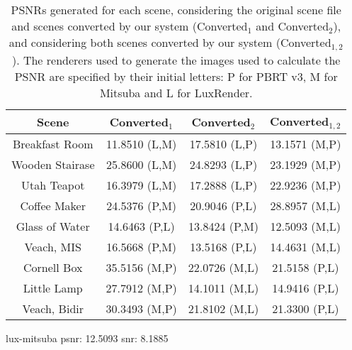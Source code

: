 \scriptsize
\begin{table}
\begin{center}
    \setlength\extrarowheight{4pt}
    \begin{tabular}{ | c | c | c | c | }
    \hline
    {\bf Scene} & {\bf Converted$_1$} & {\bf Converted$_2$} & {\bf Converted$_{1,2}$} \\ 
    \hline
    Breakfast Room & 11.8510 \small{(L,M)} & 17.5810 \small{(L,P)} & 13.1571 \small{(M,P)} \\
    Wooden Stairase & 25.8600 \small{(L,M)} & 24.8293 \small{(L,P)} & 23.1929 \small{(M,P)} \\
    Utah Teapot & 16.3979 \small{(L,M)} & 17.2888 \small{(L,P)} & 22.9236 \small{(M,P)} \\
    Coffee Maker & 24.5376 \small{(P,M)} & 20.9046 \small{(P,L)} & 28.8957 \small{(M,L)} \\
    Glass of Water & 14.6463 \small{(P,L)} & 13.8424 \small{(P,M)} & 12.5093 \small{(M,L)} \\
    Veach, MIS & 16.5668 \small{(P,M)} & 13.5168 \small{(P,L)} & 14.4631 \small{(M,L)} \\
    Cornell Box & 35.5156 \small{(M,P)} & 22.0726 \small{(M,L)} & 21.5158 \small{(P,L)} \\
    Little Lamp & 27.7912 \small{(M,P)} & 14.1011 \small{(M,L)} & 14.9416 \small{(P,L)} \\
    Veach, Bidir & 30.3493 \small{(M,P)} & 21.8102 \small{(M,L)} & 21.3300 \small{(P,L)} \\
    
    \hline

    \end{tabular}
\end{center}
  \caption{PSNRs generated for each scene, considering the original scene file and scenes converted by our system (Converted$_1$ and Converted$_2$), and considering both scenes converted by our system (Converted$_{1,2}$). The renderers used to generate the images used to calculate the PSNR are specified by their initial letters: P for PBRT v3, M for Mitsuba and L for LuxRender. } 
  \label{table:psnr}
\end{table}
\normalsize 


lux-mitsuba
psnr: 12.5093
snr: 8.1885
